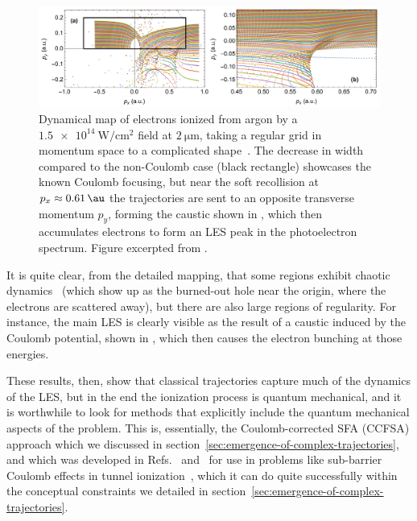 \begin{figure}[htb]
  \centering
  \subfloat{\label{f6-kelvich-original-figure-a}}
  \subfloat{\label{f6-kelvich-original-figure-b}}
  \includegraphics[width=392pt]{6-LES/Figures/figure6K.png}
  \caption[
  High-resolution dynamical map of full classical photoelectron trajectories, showing LES bunching as the result of a caustic in the dynamical map, as calculated by S.A. Kelvich et al.
  ]{
  Dynamical map of electrons ionized from argon by a $\SI{1.5e14}{\watt/\centi\meter^2}$ field at $\SI{2}{\micro\meter}$, taking a regular grid in momentum space to a complicated shape~\cite{kelvich_coulomb-focusing_2015}. The decrease in width compared to the non-Coulomb case (black rectangle) showcases the known Coulomb focusing, but near the soft recollision at $p_x\approx\SI{0.61}{\au}$ the trajectories are sent to an opposite transverse momentum $p_y$, forming the caustic shown in \protect{}, which then accumulates electrons to form an LES peak in the photoelectron spectrum.
  Figure excerpted from .
  }
\label{f6-kelvich-dynamical-map}
\end{figure}

It is quite clear, from the detailed mapping, that some regions exhibit chaotic dynamics~\cite{chaotic_dynamics} (which show up as the burned-out hole near the origin, where the electrons are scattered away), but there are also large regions of regularity. For instance, the main LES is clearly visible as the result of a caustic induced by the Coulomb potential, shown in , which then causes the electron bunching at those energies.





These results, then, show that classical trajectories capture much of the dynamics of the LES, but in the end the ionization process is quantum mechanical, and it is worthwhile to look for methods that explicitly include the quantum mechanical aspects of the problem. This is, essentially, the Coulomb-corrected SFA (CCFSA) approach which we discussed in section~\ref{sec:emergence-of-complex-trajectories}, and which was developed in Refs.~\citealp{CCSFA_initial_short} and~\citealp{ CCSFA_initial_full} for use in problems like sub-barrier Coulomb effects in tunnel ionization~\cite{TCSFA_sub_barrier}, which it can do quite successfully within the conceptual constraints we detailed in section~\ref{sec:emergence-of-complex-trajectories}.

